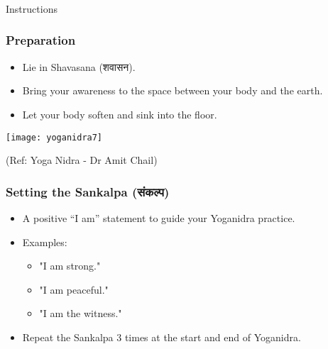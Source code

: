 \begin{frame}[fragile]\frametitle{}
\begin{center}
{\Large Instructions}
\end{center}
\end{frame}


\begin{frame}[fragile]\frametitle{Preparation}
    \begin{itemize}
        \item Lie in Shavasana (शवासन).
        \item Bring your awareness to the space between your body and the earth.
        \item Let your body soften and sink into the floor.    
	\end{itemize}
	
      \begin{center}
        \texttt{[image: yoganidra7]}

		{\tiny (Ref: Yoga Nidra - Dr Amit Chail)}		
        \end{center}	
\end{frame}

\begin{frame}[fragile]\frametitle{Setting the Sankalpa (संकल्प)}
    \begin{itemize}
        \item A positive “I am” statement to guide your Yoganidra practice.
        \item Examples:
        \begin{itemize}
            \item "I am strong."
            \item "I am peaceful."
            \item "I am the witness."
        \end{itemize}
        \item Repeat the Sankalpa 3 times at the start and end of Yoganidra.
    \end{itemize}
\end{frame}

